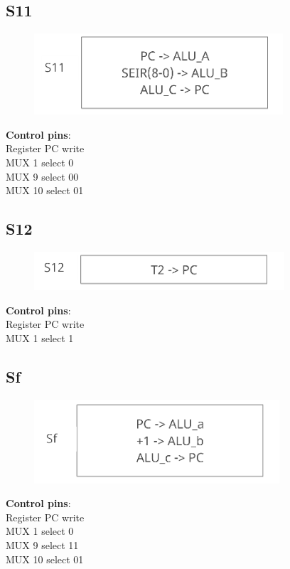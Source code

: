 \documentclass[11pt, fleqn]{article}
\begin{document}
\subsection*{\centering S11}
\begin{figure}[H]
    \centering
    \includegraphics{DataPath/DataPath_S11.PNG}
\end{figure}
\begin{center}
\textbf{Control pins}: \\
Register PC write \\
MUX 1 select 0 \\
MUX 9 select 00 \\
MUX 10 select 01 \\
\end{center}

\bigskip

\subsection*{\centering S12}
\begin{figure}[H]
    \centering
    \includegraphics{DataPath/DataPath_S12.PNG}
\end{figure}
\begin{center}
\textbf{Control pins}: \\
Register PC write \\
MUX 1 select 1 \\
\end{center}

\bigskip

\subsection*{\centering Sf}
\begin{figure}[H]
    \centering
    \includegraphics{DataPath/DataPath_Sf.PNG}
\end{figure}
\begin{center}
\textbf{Control pins}: \\
Register PC write \\
MUX 1 select 0 \\
MUX 9 select 11 \\
MUX 10 select 01 \\
\end{center}
\end{document}
